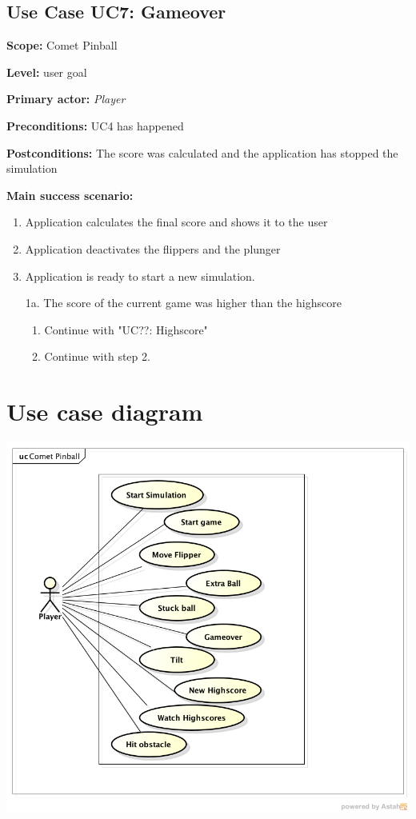 \documentclass[fontsize=12pt,
               paper=a4,
               twoside=false,
               parskip=half,
               ]{scrartcl}
\begin{document}

\subsection{Use Case UC7: Gameover}

\textbf{\textsf{Scope:}} Comet Pinball

\textbf{\textsf{Level:}} user goal

\textbf{\textsf{Primary actor:}} \emph{Player}

\textbf{\textsf{Preconditions:}} UC4 has happened

\textbf{\textsf{Postconditions:}} The score was calculated and the application has stopped the simulation

\textbf{\textsf{Main success scenario:}}

\begin{enumerate}[leftmargin=3em]
	\item Application calculates the final score and shows it to the user
	\item Application deactivates the flippers and the plunger
	\item Application is ready to start a new simulation.
\end{enumerate}


\begin{itemize}[leftmargin=3em]
	\item[1a.]  The score of the current game was higher than the highscore
	\begin{enumerate}
		\item Continue with "UC??: Highscore"
		\item Continue with step 2.
	\end{enumerate}
\end{itemize}



\section{Use case diagram}


\includegraphics[width=15cm]{./img/usecase-model.png}
\end{document}

